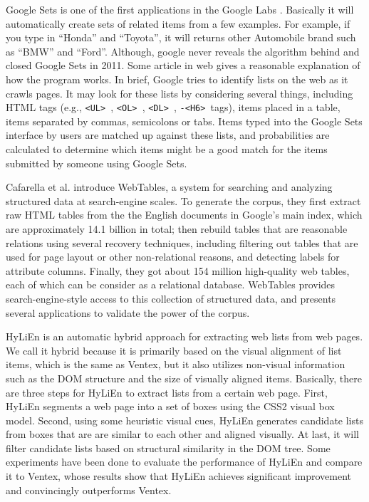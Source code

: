 
Google Sets\cite{googlesets} is one of the first applications in the
Google Labs \cite{googlelabs}.  Basically it will automatically create
sets of related items from a few examples.  For example, if you type
in ``Honda'' and ``Toyota'', it will returns other Automobile brand
such as ``BMW'' and ``Ford''.  Although, google never reveals the
algorithm behind and closed Google Sets in 2011.  Some
article\cite{howGoogleSetsWorks} in web gives a reasonable explanation
of how the program works.  In brief, Google tries to identify lists on
the web as it crawls pages.  It may look for these lists by
considering several things, including HTML tags (e.g., {\tt <UL> },
{\tt<OL> }, {\tt<DL> }, {\tt <H1>-<H6> }tags), items placed in a
table, items separated by commas, semicolons or tabs.  Items typed
into the Google Sets interface by users are matched up against these
lists, and probabilities are calculated to determine which items might
be a good match for the items submitted by someone using Google Sets.

Cafarella et al.\cite{webtables08} introduce WebTables, a system for
searching and analyzing structured data at search-engine scales.  To
generate the corpus, they first extract raw HTML tables from the the
English documents in Google's main index, which are approximately 14.1
billion in total; then rebuild tables that are reasonable relations
using several recovery techniques, including filtering out tables that
are used for page layout or other non-relational reasons, and
detecting labels for attribute columns.  Finally, they got about 154
million high-quality web tables, each of which can be consider as a
relational database.  WebTables provides search-engine-style access to
this collection of structured data, and presents several applications
to validate the power of the corpus.

HyLiEn \cite{FumarolaWBMH11:List} is an automatic hybrid approach for
extracting web lists from web pages.  We call it hybrid because it is
primarily based on the visual alignment of list items, which is the
same as Ventex\cite{GatterbauerBHKP2007:Towards}, but it also utilizes
non-visual information such as the DOM structure and the size of
visually aligned items.  Basically, there are three steps for HyLiEn
to extract lists from a certain web page.  First, HyLiEn segments a
web page into a set of boxes using the CSS2 visual box
model\cite{CCS2Box}.  Second, using some heuristic visual cues, HyLiEn
generates candidate lists from boxes that are are similar to each
other and aligned visually.  At last, it will filter candidate lists
based on structural similarity in the DOM tree.  Some experiments have
been done to evaluate the performance of HyLiEn and compare it to
Ventex, whose results show that HyLiEn achieves significant
improvement and convincingly outperforms Ventex.

